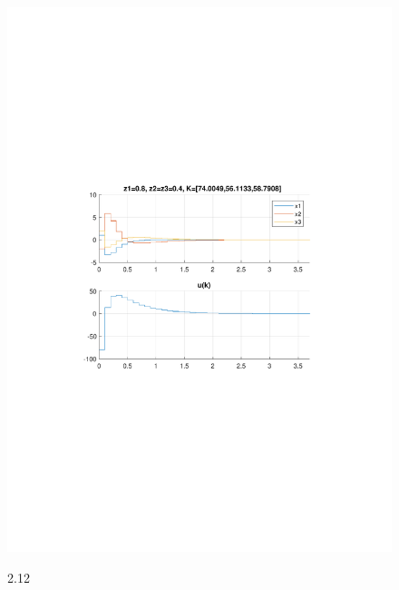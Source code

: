 \documentclass{article}
\begin{document}
{\begin{figure}[H]
\includegraphics[clip, trim=0.5cm 9.5cm 0.5cm 9.5cm, width=1.00\textwidth]{../rys/zad3b_rys12.pdf}
\label{fig:rys3.2.12}
\caption{2.12}
\end{figure}
}
\end{document}
